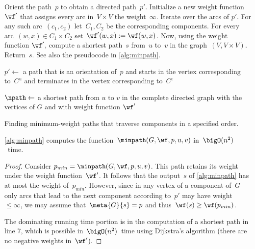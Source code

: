 Orient the path~$p$ to obtain a directed path~$p'$. Initialize a new weight function~$\wf'$ that assigns every arc in~$V \times V$ the weight~$\infty$. Iterate over the arcs of $p'$. For any such arc~$(c_1, c_2)$ let~$C_1, C_2$ be the corresponding components. For every arc~$(w, x)\in C_1 \times C_2$ set~$\wf'(w,x) := \wf(w,x)$. Now, using the weight function $\wf'$, compute a shortest path~$s$ from~$u$ to~$v$ in the graph~$(V, V \times V)$. Return~$s$. See also the pseudocode in \autoref{alg:minpath}.
\begin{algorithm}
  \LinesNumbered
  


  \BlankLine
  $p' \leftarrow$ a path that is an orientation of~$p$ and starts in the vertex corresponding to~$C^{u}$ and terminates in the vertex corresponding to~$C^{v}$\;

  $\npath \leftarrow $ a shortest path from $u$ to $v$ in the complete directed graph with the vertices of $G$ and with weight function $\wf'$\;
  
  \Return{\npath\;}
    
  \caption{Finding minimum-weight paths that traverse components in a specified order.}
  \label{alg:minpath}
\end{algorithm}
\begin{lemma}
  \label{lem:minpath}
  \autoref{alg:minpath} computes the function~$\minpath(G,\wf,p,u,v)$ in~$\bigO(n^2)$~time.
\end{lemma}
\begin{proof}
  Consider $p_{min} = \minpath(G,\wf,p,u,v)$. This path retains its weight under the weight function~$\wf'$. It follows that the output~$s$ of \autoref{alg:minpath} has at most the weight of~$p_{min}$. However, since in any vertex of a component of~$G$ only arcs that lead to the next component according to~$p'$ may have weight~$\leq \infty$, we may assume that~$\meta{G}{s} = p$ and thus~$\wf(s) \geq \wf(p_{min})$.

  The dominating running time portion is in the computation of a shortest path in line 7, which is possible in~$\bigO(n^2)$~time using Dijkstra's algorithm (there are no negative weights in~$\wf'$).
\end{proof}
